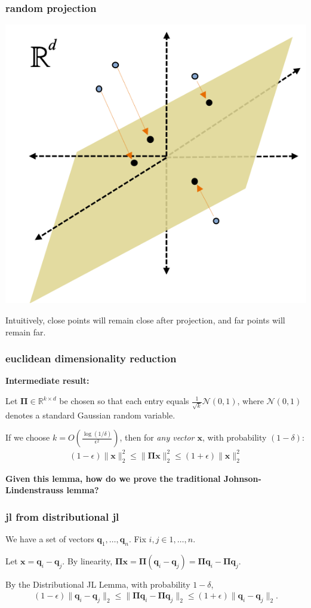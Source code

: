 \documentclass[compress]{beamer}
\newcommand{\bs}[1]{\boldsymbol{#1}}
\newcommand{\bv}[1]{\mathbf{#1}}
\newcommand{\R}{\mathbb{R}}
\begin{document}
\begin{frame}
	\frametitle{random projection}
	\begin{center}
		\includegraphics[width=.6\textwidth]{random_projection.png}
	\end{center}
	Intuitively, close points will remain close after projection, and far points will remain far. 
\end{frame}

\begin{frame}
	\frametitle{euclidean dimensionality reduction}
	\textbf{Intermediate result:}
	\begin{lemma}
		Let $\bs{\Pi} \in \R^{k\times d}$ be chosen so that each entry equals $\frac{1}{\sqrt{k}}  \mathcal{N}(0,1)$, where $\mathcal{N}(0,1)$ denotes a standard Gaussian random variable. 
		
		If we choose $k = O\left(\frac{\log(1/\delta)}{\epsilon^2}\right)$, then for \emph{any vector $\bv{x}$}, with probability $(1-\delta)$:
		\begin{align*}
			(1-\epsilon)\|\bv{x}\|_2^2 \leq \|\bs{\Pi}\bv{x}\|_2^2 \leq (1+\epsilon) \|\bv{x}\|_2^2
		\end{align*}
	\end{lemma}
	
	\begin{center}\alert{
			\textbf{Given this lemma, how do we prove the traditional Johnson-Lindenstrauss lemma?}}
	\end{center}
\end{frame}

\begin{frame}
	\frametitle{jl from distributional jl}
	We have a set of vectors $\bv{q}_1, \ldots, \bv{q}_n$. Fix $i,j \in 1,\ldots, n$. 
	
	Let $\bv{x} = \bv{q}_i - \bv{q}_j$. By linearity, $\bs{\Pi}\bv{x} = \bs{\Pi}(\bv{q}_i - \bv{q}_j) = \bs{\Pi}\bv{q}_i - \bs{\Pi}\bv{q}_j$.
	
	By the Distributional JL Lemma, with probability $1-\delta$,
	\begin{align*}
		(1-\epsilon)\|\bv{q}_i - \bv{q}_j\|_2 \leq \|\bs{\Pi}\bv{q}_i - \bs{\Pi}\bv{q}_j\|_2 \leq (1+\epsilon) \|\bv{q}_i - \bv{q}_j\|_2.
	\end{align*}	
\end{frame}
\end{document}
